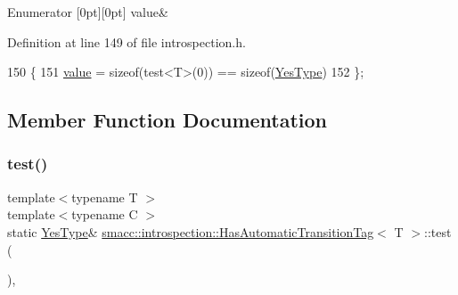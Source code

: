 \begin{DoxyEnumFields}{Enumerator}
[0pt][0pt]{}\mbox{\label{classsmacc_1_1introspection_1_1HasAutomaticTransitionTag_aa4d176f174bc660b4705a0ff3874d4aca4e813bb149aec14797ea59791542e845}} 
value&\\
\hline

\end{DoxyEnumFields}


Definition at line 149 of file introspection.\+h.


\begin{DoxyCode}
150     \{
151         \hyperlink{classsmacc_1_1introspection_1_1HasAutomaticTransitionTag_aa4d176f174bc660b4705a0ff3874d4aca4e813bb149aec14797ea59791542e845}{value} = \textcolor{keyword}{sizeof}(test<T>(0)) == \textcolor{keyword}{sizeof}(\hyperlink{classsmacc_1_1introspection_1_1HasAutomaticTransitionTag_a750a08a185de0fa20331ba7cfc531dde}{YesType})
152     \};
\end{DoxyCode}


\subsection{Member Function Documentation}
\mbox{\label{classsmacc_1_1introspection_1_1HasAutomaticTransitionTag_a9de2266c38ff1f570674289f32b0faaf}} 
\subsubsection{\texorpdfstring{test()}{test()}\hspace{0.1cm}{\footnotesize\ttfamily [1/2]}}
{\footnotesize\ttfamily template$<$typename T $>$ \\
template$<$typename C $>$ \\
static \hyperlink{classsmacc_1_1introspection_1_1HasAutomaticTransitionTag_a750a08a185de0fa20331ba7cfc531dde}{Yes\+Type}\& \hyperlink{classsmacc_1_1introspection_1_1HasAutomaticTransitionTag}{smacc\+::introspection\+::\+Has\+Automatic\+Transition\+Tag}$<$ T $>$\+::test (\begin{DoxyParamCaption}\item[{decltype \&\+::get\+Default\+Transition\+Tag}]{ }\end{DoxyParamCaption})\hspace{0.3cm}{\ttfamily [static]}, {\ttfamily [private]}}

